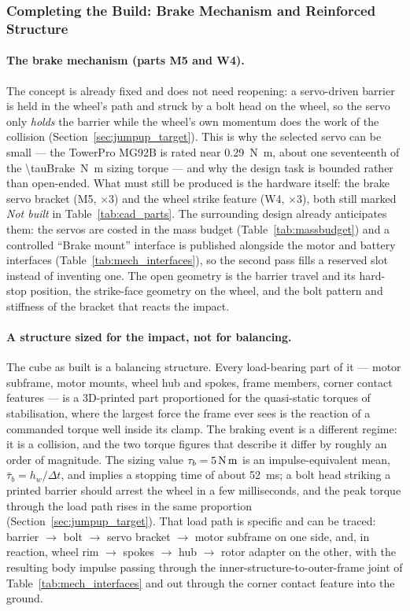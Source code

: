 \subsubsection{Completing the Build: Brake Mechanism and Reinforced Structure}
\label{sec:next_brake}

\paragraph{The brake mechanism (parts M5 and W4).} The concept is already fixed
and does not need reopening: a servo-driven barrier is held in the wheel's path
and struck by a bolt head on the wheel, so the servo only \emph{holds} the
barrier while the wheel's own momentum does the work of the collision
(Section~\ref{sec:jumpup_target}). This is why the selected servo can be small
--- the TowerPro MG92B is rated near \qty{0.29}{\newton\metre}, about one
seventeenth of the \qty{\tauBrake}{\newton\metre} sizing torque --- and why the
design task is bounded rather than open-ended. What must still be produced is
the hardware itself: the brake servo bracket (M5, $\times 3$) and the wheel
strike feature (W4, $\times 3$), both still marked \emph{Not built} in
Table~\ref{tab:cad_parts}. The surrounding design already anticipates them: the
servos are costed in the mass budget (Table~\ref{tab:massbudget}) and a
controlled ``Brake mount'' interface is published alongside the motor and battery
interfaces (Table~\ref{tab:mech_interfaces}), so the second pass fills a
reserved slot instead of inventing one. The open geometry is the barrier travel
and its hard-stop position, the strike-face geometry on the wheel, and the bolt
pattern and stiffness of the bracket that reacts the impact.

\paragraph{A structure sized for the impact, not for balancing.} The cube as
built is a balancing structure. Every load-bearing part of it --- motor
subframe, motor mounts, wheel hub and spokes, frame members, corner contact
features --- is a 3D-printed part proportioned for the quasi-static torques of
stabilisation, where the largest force the frame ever sees is the reaction of a
commanded torque well inside its clamp. The braking event is a different
regime: it is a collision, and the two torque figures that describe it differ by
roughly an order of magnitude. The sizing value
$\tau_b = \qty{5}{\newton\metre}$ is an impulse-equivalent mean,
$\bar\tau_b = h_w/\Delta t$, and implies a stopping time of about
\qty{52}{\milli\second}; a bolt head striking a printed barrier should arrest
the wheel in a few milliseconds, and the peak torque through the load path rises
in the same proportion (Section~\ref{sec:jumpup_target}). That load path is
specific and can be traced: barrier $\rightarrow$ bolt $\rightarrow$ servo
bracket $\rightarrow$ motor subframe on one side, and, in reaction, wheel rim
$\rightarrow$ spokes $\rightarrow$ hub $\rightarrow$ rotor adapter on the other,
with the resulting body impulse passing through the inner-structure-to-outer-frame
joint of Table~\ref{tab:mech_interfaces} and out through the corner contact
feature into the ground.

